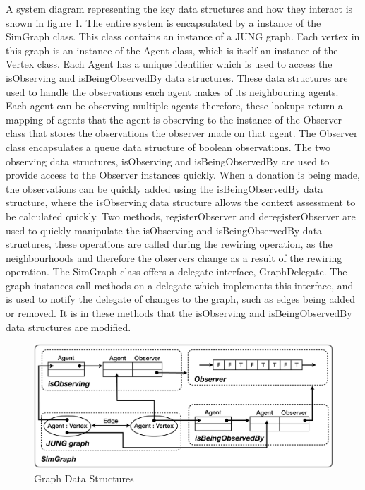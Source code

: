A system diagram representing the key data structures and how they interact is shown in figure \ref{fig:graphdatastructures}. The entire system is encapsulated by a instance of the SimGraph class. This class contains an instance of a JUNG graph. Each vertex in this graph is an instance of the Agent class, which is itself an instance of the Vertex class. Each Agent has a unique identifier which is used to access the isObserving and isBeingObservedBy data structures. These data structures are used to handle the observations each agent makes of its neighbouring agents. Each agent can be observing multiple agents therefore, these lookups return a mapping of agents that the agent is observing to the instance of the Observer class that stores the observations the observer made on that agent. The Observer class encapsulates a queue data structure of boolean observations. The two observing data structures, isObserving and isBeingObservedBy are used to provide access to the Observer instances quickly. When a donation is being made, the observations can be quickly added using the isBeingObservedBy data structure, where the isObserving data structure allows the context assessment to be calculated quickly. Two methods, registerObserver and deregisterObserver are used to quickly manipulate the isObserving and isBeingObservedBy data structures, these operations are called during the rewiring operation, as the neighbourhoods and therefore the observers change as a result of the rewiring operation.
The SimGraph class offers a delegate interface, GraphDelegate. The graph instances call methods on a delegate which implements this interface, and is used to notify the delegate of changes to the graph, such as edges being added or removed. It is in these methods that the isObserving and isBeingObservedBy data structures are modified.

\begin{figure}[h]
	\centering
	\includegraphics[width=\linewidth]{img/GraphDataStructure.pdf}
	\caption{Graph Data Structures}
	\label{fig:graphdatastructures}
\end{figure}

